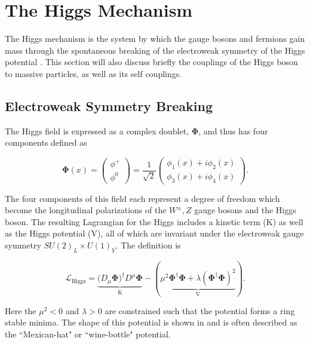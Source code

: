 \section{The Higgs Mechanism} \label{sec:theory:higgs}

The Higgs mechanism is the system by which the gauge bosons and fermions gain
mass through the spontaneous breaking of the electroweak symmetry of the Higgs
potential \cite{Higgs:1964ia,Higgs:1966ev,Thomson:2013zua}.  This section will
also discuss briefly the couplings of the Higgs boson to massive particles, as
well as its self couplings.

\subsection{Electroweak Symmetry Breaking}

The Higgs field is expressed as a complex doublet, $\boldsymbol{\Phi}$, and thus
has four components defined as

\begin{equation} \label{eq:higgs:higgs_field}
\boldsymbol{\Phi}(x) = \left( \begin{matrix} \phi^{+} \\ \phi^{0} \end{matrix}
\right) = \frac{1}{\sqrt{2}} \left( \begin{matrix} \phi_{1}(x) + i\phi_{2}(x) \\
\phi_{3}(x) + i\phi_{4}(x) \end{matrix} \right).
\end{equation}

The four components of this field each represent a degree of freedom which
become the longitudinal polarizations of the $W^{\pm},Z$ gauge bosons and the
Higgs boson.  The resulting Lagrangian for the Higgs includes a kinetic term
(K) as well as the Higgs potential (V), all of which are invariant under the
electroweak gauge symmetry $SU(2)_L \times U(1)_Y$.  The definition is

\begin{equation} \label{eq:higgs:lagrangian}
\mathcal{L}_{\text{Higgs}} =
\underbrace{(D_{\mu}\boldsymbol{\Phi)^{\dagger}}D^{\mu}\boldsymbol{\Phi}}_{\text{K}}
- (\underbrace{\mu^{2}\boldsymbol{\Phi}^{\dagger}\boldsymbol{\Phi} +
  \lambda(\boldsymbol{\Phi}^{\dagger}\boldsymbol{\Phi})^{2}}_{\text{V}}).
\end{equation}

Here the $\mu^{2} < 0$ and $\lambda > 0$ are constrained such that the
potential forms a ring stable minima.  The shape of this potential is shown in
 and is often described as the ``Mexican-hat" or
``wine-bottle" potential. 

